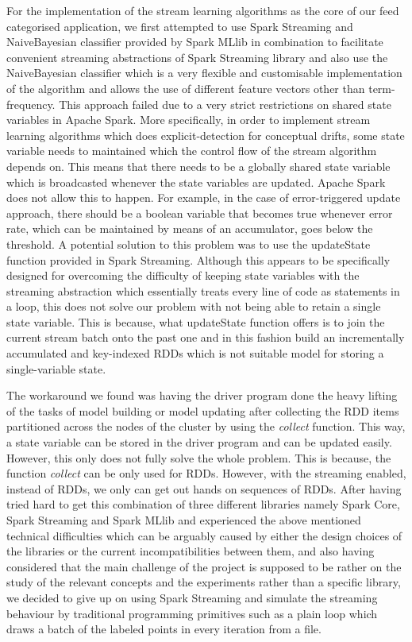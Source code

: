 \documentclass{article} %
\begin{document}
For the implementation of the stream learning algorithms as the core of our feed categorised application, we first attempted to use Spark Streaming and NaiveBayesian classifier provided by Spark MLlib in combination to facilitate convenient streaming abstractions of Spark Streaming library and also use the NaiveBayesian classifier which is a very flexible and customisable implementation of the algorithm and allows the use of different feature vectors other than term-frequency. This approach failed due to a very strict restrictions on shared state variables in Apache Spark. More specifically, in order to implement stream learning algorithms which does explicit-detection for conceptual drifts, some state variable needs to maintained which the control flow of the stream algorithm depends on. This means that there needs to be a globally shared state variable which is broadcasted whenever the state variables are updated. Apache Spark does not allow this to happen. For example, in the case of error-triggered update approach, there should be a boolean variable that becomes true whenever error rate, which can be maintained by means of an accumulator, goes below the threshold. A potential solution to this problem was to use the updateState function provided in Spark Streaming. Although this appears to be specifically designed for overcoming the difficulty of keeping state variables with the streaming abstraction which essentially treats every line of code as statements in a loop, this does not solve our problem with not being able to retain a single state variable. This is because, what updateState function offers is to join the current stream batch onto the past one and in this fashion build an incrementally accumulated and key-indexed RDDs which is not suitable model for storing a single-variable state. 
 
The workaround we found was having the driver program done the heavy lifting of the tasks of model building or model updating after collecting the RDD items partitioned across the nodes of the cluster by using the \textit{collect} function. This way, a state variable can be stored in the driver program and can be updated easily. However, this only does not fully solve the whole problem. This is because, the function \textit{collect}  can be only used for RDDs. However, with the streaming enabled, instead of RDDs, we only can get out hands on sequences of RDDs. After having tried hard to get this combination of three different libraries namely Spark Core, Spark Streaming and Spark MLlib and experienced the above mentioned technical difficulties which can be arguably caused by either the design choices of the libraries or the current incompatibilities between them, and also having considered that the main challenge of the project is supposed to be rather on the study of the relevant concepts and the experiments rather than a specific library, we decided to give up on using Spark Streaming and simulate the streaming behaviour by traditional programming primitives such as a plain loop which draws a batch of the labeled points in every iteration from a file.
\end{document}
